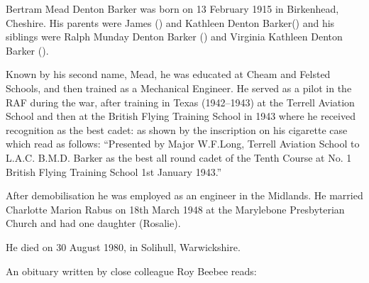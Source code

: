 
Bertram Mead Denton Barker was born on 13 February 1915 in Birkenhead, Cheshire.  His parents were James () and Kathleen Denton Barker() and his siblings were Ralph Munday Denton Barker () and Virginia Kathleen Denton Barker ().

Known by his second name, Mead, he was educated at Cheam and Felsted Schools, and then trained as a Mechanical Engineer. He served as a pilot in the RAF during the war,  after training in Texas (1942--1943) at the Terrell Aviation School and then at the British Flying Training School in 1943 where he  received recognition as the best cadet:  as shown by the inscription on his cigarette case which read as follows: ``Presented by Major W.F.Long, Terrell Aviation School to L.A.C. B.M.D. Barker as the best all round cadet of the Tenth Course at No. 1 British Flying Training School 1st January 1943.''

After demobilisation he was employed as an engineer in the Midlands. He married Charlotte Marion Rabus on 18th March 1948 at the Marylebone Presbyterian Church \cite{TheTimes1948-03-22} and had one daughter (Rosalie).

He died on 30 August 1980, in Solihull, Warwickshire. 

An obituary written by close colleague Roy Beebee reads:

